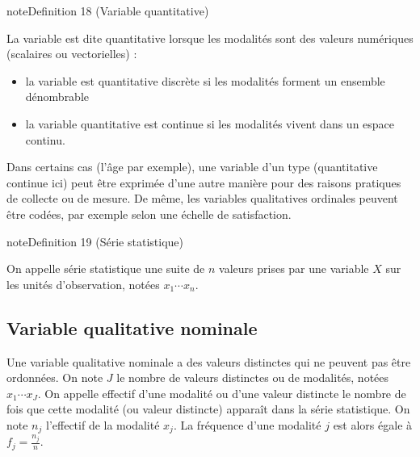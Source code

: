 \documentclass[letterpaper,10pt,french]{sphinxmanual}
\begin{document}
\ignorespaces \label{statsdescriptives:definition-1}
\begin{sphinxadmonition}{note}{Definition 18 (Variable quantitative)}



\sphinxAtStartPar
La variable est dite quantitative lorsque les modalités sont des valeurs numériques (scalaires ou vectorielles) :
\begin{itemize}
\item {} 
\sphinxAtStartPar
la variable est quantitative discrète si les modalités forment un ensemble dénombrable

\item {} 
\sphinxAtStartPar
la variable quantitative est continue si les modalités vivent dans un espace continu.

\end{itemize}
\end{sphinxadmonition}

\sphinxAtStartPar
Dans certains cas (l’âge par exemple), une variable d’un type (quantitative continue ici) peut être exprimée d’une autre manière pour des raisons pratiques de collecte ou de mesure. De même, les variables qualitatives ordinales peuvent être codées, par exemple selon une échelle de satisfaction.

\ignorespaces \label{statsdescriptives:definition-2}
\begin{sphinxadmonition}{note}{Definition 19 (Série statistique)}



\sphinxAtStartPar
On appelle série statistique une suite de \(n\) valeurs prises par une variable \(X\) sur les unités d’observation, notées \(x_1\cdots x_n\).
\end{sphinxadmonition}


\subsection{Variable qualitative nominale}
\label{\detokenize{statsdescriptives:variable-qualitative-nominale}}
\ignorespaces 
\sphinxAtStartPar
Une variable qualitative nominale a des valeurs distinctes qui ne peuvent pas être ordonnées. On note \(J\) le nombre de valeurs distinctes ou de modalités, notées \(x_1\cdots x_J\). On appelle effectif d’une modalité ou d’une valeur distincte le nombre de fois que cette modalité (ou valeur distincte) apparaît dans la série statistique. On note \(n_j\) l’effectif de la modalité \(x_j\). La fréquence d’une modalité \(j\) est  alors égale à \(f_j=\frac{n_j}{n}\).
\end{document}
